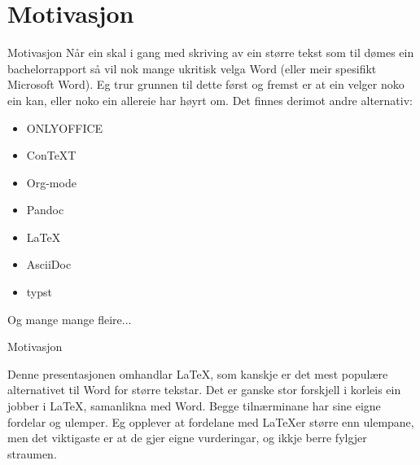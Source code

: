 \section{Motivasjon}

\begin{frame}{Motivasjon}
Når ein skal i gang med skriving av ein større tekst som til dømes ein bachelorrapport så vil nok mange ukritisk velga Word (eller meir spesifikt Microsoft Word). Eg trur grunnen til dette først og fremst er at ein velger noko ein kan, eller noko ein allereie har høyrt om. Det finnes derimot andre alternativ:

\begin{itemize}
	\item ONLYOFFICE
	\item ConTeXT
	\item Org-mode
	\item Pandoc
	\item \LaTeX
        \item AsciiDoc
        \item typst
\end{itemize}

Og mange mange fleire...

\end{frame}


\begin{frame}{Motivasjon}

Denne presentasjonen omhandlar \LaTeX, som kanskje er det mest populære alternativet til Word for større tekstar. Det er ganske stor forskjell i korleis ein jobber i \LaTeX, samanlikna med Word. Begge tilnærminane har sine eigne fordelar og ulemper. Eg opplever at fordelane med \LaTeX er større enn ulempane, men det viktigaste er at de gjer eigne vurderingar, og ikkje berre fylgjer straumen.
	
\end{frame}

